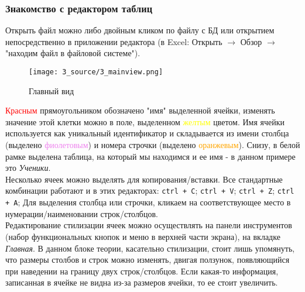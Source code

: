 \documentclass[12pt]{article}
\theoremstyle{problem_style}
\begin{document}
\subsubsection{Знакомство с редактором таблиц}
Открыть файл можно либо двойным кликом по файлу с БД или открытием непосредственно в приложении редактора (в Excel: Открыть $\to$ Обзор $\to$ "находим файл в файловой системе"). 
\begin{figure}[H]
    \centering
    \texttt{[image: 3\_source/3\_mainview.png]}
    \caption{Главный вид}
    \label{fig:excel_mainview}
\end{figure}
\textcolor{red}{Красным} прямоугольником обозначено "имя" выделенной ячейки, изменять значение этой клетки можно в поле, выделенном \textcolor{yellow}{желтым} цветом. Имя ячейки используется как уникальный идентификатор и складывается из имени столбца (выделено \textcolor{violet}{фиолетовым}) и номера строчки (выделено \textcolor{orange}{оранжевым}). Снизу, в белой рамке выделена таблица, на который мы находимся и ее имя - в данном примере это \textit{Ученики}.\\
Несколько ячеек можно выделять для копирования/вставки. Все стандартные комбинации работают и в этих редакторах: \texttt{ctrl + C}; \texttt{ctrl + V}; \texttt{ctrl + Z}; \texttt{ctrl + A}; Для выделения столбца или строчки, кликаем на соответствующее место в нумерации/наименовании строк/столбцов.\\ 
Редактирование стилизации ячеек можно осуществлять на панели инструментов (набор функциональных кнопок и меню в верхней части экрана), на вкладке \textit{Главная}. В данном блоке теории, касательно стилизации, стоит лишь упомянуть, что размеры столбов и строк можно изменять, двигая ползунок, появляющийся при наведении на границу двух строк/столбцов. Если какая-то информация, записанная в ячейке не видна из-за размеров ячейки, то ее стоит увеличить.
\end{document}
